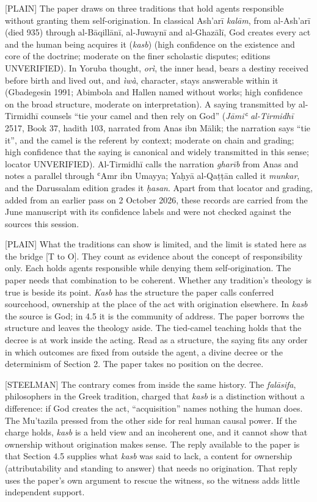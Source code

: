 \documentclass[11pt]{article}
\newcommand{\register}[1]{{\ttfamily\small #1}}
\begin{document}
\register{[PLAIN]} The paper draws on three traditions that hold agents responsible without granting them self-origination. In classical Ash'arī \emph{kalām}, from al-Ash'arī (died 935) through al-Bāqillānī, al-Juwaynī and al-Ghazālī, God creates every act and the human being acquires it (\emph{kasb}) (high confidence on the existence and core of the doctrine; moderate on the finer scholastic disputes; editions UNVERIFIED). In Yoruba thought, \emph{orì}, the inner head, bears a destiny received before birth and lived out, and \emph{ìwà}, character, stays answerable within it (Gbadegesin 1991; Abimbola and Hallen named without works; high confidence on the broad structure, moderate on interpretation). A saying transmitted by al-Tirmidhī counsels ``tie your camel and then rely on God'' (\emph{Jāmiʿ al-Tirmidhī} 2517, Book 37, hadith 103, narrated from Anas ibn Mālik; the narration says ``tie it'', and the camel is the referent by context; moderate on chain and grading; high confidence that the saying is canonical and widely transmitted in this sense; locator UNVERIFIED). Al-Tirmidhī calls the narration \emph{gharīb} from Anas and notes a parallel through ʿAmr ibn Umayya; Yaḥyā al-Qaṭṭān called it \emph{munkar}, and the Darussalam edition grades it \emph{ḥasan}. Apart from that locator and grading, added from an earlier pass on 2 October 2026, these records are carried from the June manuscript with its confidence labels and were not checked against the sources this session.

\register{[PLAIN]} What the traditions can show is limited, and the limit is stated here as the bridge [T to O]. They count as evidence about the concept of responsibility only. Each holds agents responsible while denying them self-origination. The paper needs that combination to be coherent. Whether any tradition's theology is true is beside its point. \emph{Kasb} has the structure the paper calls conferred sourcehood, ownership at the place of the act with origination elsewhere. In \emph{kasb} the source is God; in 4.5 it is the community of address. The paper borrows the structure and leaves the theology aside. The tied-camel teaching holds that the decree is at work inside the acting. Read as a structure, the saying fits any order in which outcomes are fixed from outside the agent, a divine decree or the determinism of Section 2. The paper takes no position on the decree.

\register{[STEELMAN]} The contrary comes from inside the same history. The \emph{falāsifa}, philosophers in the Greek tradition, charged that \emph{kasb} is a distinction without a difference: if God creates the act, ``acquisition'' names nothing the human does. The Mu'tazila pressed from the other side for real human causal power. If the charge holds, \emph{kasb} is a held view and an incoherent one, and it cannot show that ownership without origination makes sense. The reply available to the paper is that Section 4.5 supplies what \emph{kasb} was said to lack, a content for ownership (attributability and standing to answer) that needs no origination. That reply uses the paper's own argument to rescue the witness, so the witness adds little independent support.
\end{document}

